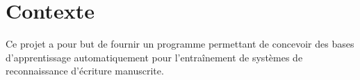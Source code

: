 \chapter{Contexte}

Ce projet a pour but de fournir un programme permettant de concevoir des bases d'apprentissage automatiquement pour l'entraînement de systèmes de reconnaissance d'écriture manuscrite. 